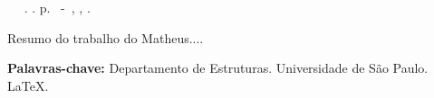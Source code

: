 \documentclass[_ArquivoPrincipal.tex]{subfiles}
\begin{document}
	\setlength{\absparsep}{18pt} %
	\begin{resumo}
		\begin{flushleft} 
			\setlength{\absparsep}{0pt} %
			\SingleSpacing 
			\imprimirautorabr~ ~\textbf{\imprimirtitulo}.	\imprimirdata. \pageref{LastPage}p. 
			\imprimirtipotrabalho~-~\imprimirinstituicao, \imprimirlocal, \imprimirdata. 
		\end{flushleft}
		\OnehalfSpacing 	
		
		Resumo do trabalho do Matheus....
		
		\textbf{Palavras-chave:} Departamento de Estruturas. Universidade de São Paulo. LaTeX.
	\end{resumo}
\end{document}
